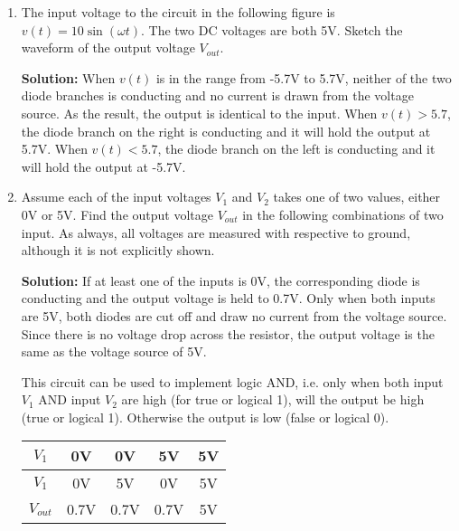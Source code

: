 \begin{enumerate}

{\bf Solution:} This is a full-wave rectifier circuit, which turns the
negative half cycle of the input to positive, so that the period of the
output is $T=1/120=0.0083S$. The charge of the capacitor reduced during
this period is $Q=IT=2A\times 0.083 S=0.0167 C$. If the voltage across
the capacitor is dropped by less than $V_C=0.05\times 12=0.6V$, its 
capacitance has to be greater than $C=Q/V_C=0.0167/0.6=0.0278 F$.

The peak voltage of input is $115\times \sqrt{2}=162.6$, the peak voltage
of the output is $12V$. If the 1.4 V voltage drop across the two diodes 
is considered small enough when compared with the required 12 V, then
the turn ratio of the transformer is $162.6/12=13.55$. Otherwise, the 
the turn ratio is $162.6/(12+1.4)=12.13$.

\item The input voltage to the circuit in the following figure is
$v(t)=10 \sin (\omega t)$. The two DC voltages are both 5V. Sketch the
waveform of the output voltage $V_{out}$.


{\bf Solution:} When $v(t)$ is in the range from -5.7V to 5.7V, neither
of the two diode branches is conducting and no current is drawn from the
voltage source. As the result, the output is identical to the input.
When $v(t)>5.7$, the diode branch on the right is conducting and it
will hold the output at 5.7V. When $v(t)<5.7$, the diode branch on the
left is conducting and it will hold the output at -5.7V.

 
\item Assume each of the input voltages $V_1$ and $V_2$ takes one of
two values, either 0V or 5V. Find the output voltage $V_{out}$ in the
following combinations of two input. As always, all voltages are 
measured with respective to ground, although it is not explicitly 
shown.

{\bf Solution:}  If at least one of the inputs is 0V, the corresponding
diode is conducting and the output voltage is held to 0.7V. Only when
both inputs are 5V, both diodes are cut off and draw no current from the
voltage source. Since there is no voltage drop across the resistor, the
output voltage is the same as the voltage source of 5V. 

This circuit can be used to implement logic AND, i.e. only when both 
input $V_1$ AND input $V_2$ are high (for true or logical 1), will the
output be high (true or logical 1). Otherwise the output is low (false
or logical 0).

\begin{tabular}{c||c c c c}\hline\hline
$V_1$ & 0V & 0V & 5V & 5V \\ \hline
$V_1$ & 0V & 5V & 0V & 5V \\ \hline
$V_{out}$ & 0.7V & 0.7V & 0.7V & 5V  &   \\
\end{tabular}



\end{enumerate}


